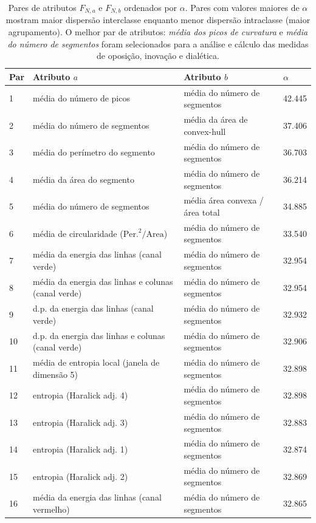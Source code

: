 \begin{table}[ht] \footnotesize
  \begin{center}
  \caption{\label{tab:alpha} Pares de atributos $F_{N, a}$ e $F_{N, b}$
    ordenados por
    $\alpha$. Pares com valores maiores de $\alpha$ mostram maior dispersão
    interclasse enquanto menor dispersão intraclasse (maior agrupamento).
    O melhor par de atributos: \emph{média dos picos de curvatura} e
    \emph{média do número de segmentos} foram selecionados para a análise e
    cálculo das medidas de oposição, inovação e dialética.}
\begin{tabular}{@{}llll}
 \hline \hline
 Par & Atributo $a$    & Atributo $b$   & $\alpha$ \\ 
 
 \hline
 
 1 & média do número de picos & média do número de segmentos & 42.445 \\
 2 & média do número de segmentos & média da área de convex-hull & 37.406 \\
 3 & média do perímetro do segmento & média do número de segmentos & 36.703 \\
 4 & média da área do segmento & média do número de segmentos & 36.214 \\
 5 & média do número de segmentos & média área convexa / área total & 34.885 \\
 6 & média de circularidade ($\mathrm{Per.}^2/\mathrm{Area}$) & média do número
 de segmentos & 33.540 \\
 7 & média da energia das linhas (canal verde) & média do número de segmentos & 32.954 \\
 8 & média da energia das linhas e colunas (canal verde) & média do número de segmentos & 32.954 \\
 9 & d.p. da energia das linhas (canal verde) & média do número de segmentos & 32.932 \\
 10 & d.p. da energia das linhas e colunas (canal verde) & média do número
 de segmentos & 32.906 \\
 11 & média de entropia local (janela de dimensão 5) & média do número de segmentos & 32.898 \\
 12 & entropia (Haralick adj. 4) & média do número de segmentos & 32.898 \\
 13 & entropia (Haralick adj. 3) & média do número de segmentos & 32.883 \\
 14 & entropia (Haralick adj. 1) & média do número de segmentos & 32.874 \\
 15 & entropia (Haralick adj. 2) & média do número de segmentos & 32.869 \\
 16 & média da energia das linhas (canal vermelho) & média do número de segmentos & 32.865 \\
\hline \hline
 \end{tabular}
 \fonteminha
\end{center}
\end{table}

